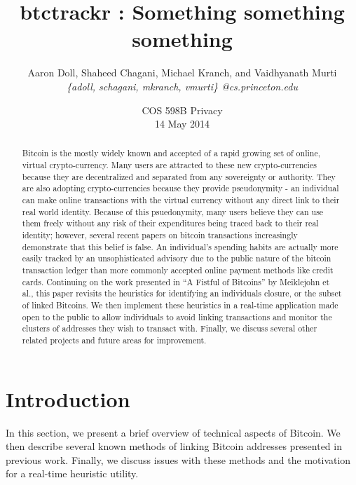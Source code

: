 \documentclass[10pt, letterpaper, twocolumn, twoside]{article}
\title{\bf btctrackr : Something something something}
\author{Aaron Doll, Shaheed Chagani, Michael Kranch, and Vaidhyanath Murti\\
\textit{\{adoll, schagani, mkranch, vmurti\} @cs.princeton.edu}}
\date{COS 598B Privacy \\ 14 May 2014}
\begin{document}
\maketitle

\thispagestyle{empty}

\begin{abstract}
Bitcoin is the mostly widely known and accepted of a rapid growing set of online, virtual crypto-currency. Many users are attracted to these new crypto-currencies because they are decentralized and separated from any sovereignty or authority. They are also adopting crypto-currencies because they provide pseudonymity - an individual can make online transactions with the virtual currency without any direct link to their real world identity. Because of this psuedonymity, many users believe they can use them freely without any risk of their expenditures being traced back to their real identity; however, several recent papers on bitcoin transactions increasingly demonstrate that this belief is false. An individual's spending habits are actually more easily tracked by an unsophisticated advisory due to the public nature of the bitcoin transaction ledger than more commonly accepted online payment methods like credit cards. Continuing on the work presented in ``A Fistful of Bitcoins'' by Meiklejohn et al., this paper revisits the heuristics for identifying an individuals closure, or the subset of linked Bitcoins. We then implement these heuristics in a real-time application made open to the public to allow individuals to avoid linking transactions and monitor the clusters of addresses they wish to transact with. Finally, we discuss several other related projects and future areas for improvement.

\end{abstract}

\section{Introduction}
\label{intro}
In this section, we present a brief overview of technical aspects of Bitcoin. We then describe several known methods of linking Bitcoin addresses presented in previous work. Finally, we discuss issues with these methods and the motivation for a real-time heuristic utility. 
\end{document}
